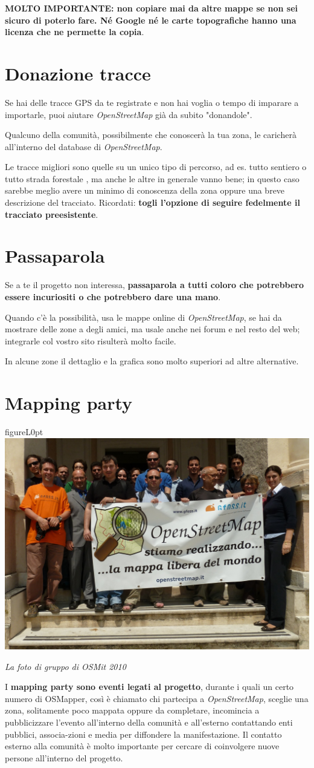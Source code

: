 \documentclass[a4paper,twoside,12pt,]{article}
\newcommand{\osm}{\emph{OpenStreetMap}\xspace}
\newcommand{\gps}{GPS\xspace}
\begin{document}
\textbf{MOLTO IMPORTANTE: non copiare mai da altre mappe se non sei sicuro di poterlo fare. Né Google né le carte topografiche hanno una licenza che ne permette la copia}.

\section{Donazione tracce}
Se hai delle tracce \gps da te registrate e non hai voglia o tempo di imparare a importarle, puoi aiutare \osm già da subito "donandole".

Qualcuno della comunità, possibilmente che conoscerà la tua zona, le caricherà all'interno del database di \osm.

Le tracce migliori sono quelle su un unico tipo di percorso, ad es. tutto sentiero o tutto strada forestale , ma anche le altre in generale vanno bene; in questo caso sarebbe meglio avere un minimo di conoscenza della zona oppure una breve descrizione del tracciato. Ricordati: \textbf{togli l'opzione di seguire fedelmente il tracciato preesistente}.
\section{Passaparola}
Se a te il progetto non interessa, \textbf{passaparola a tutti coloro che potrebbero essere incuriositi o che potrebbero dare una mano}.

Quando c'è la possibilità, usa le mappe online di \osm, se hai da mostrare delle zone a degli amici, ma usale anche nei forum e nel resto del web; integrarle col vostro sito risulterà molto facile. %
 
In alcune zone il dettaglio e la grafica sono molto superiori ad altre alternative.
\section{Mapping party}
\begin{wrapfloat}{figure}{L}{0pt}
 \includegraphics[width=0.55\columnwidth]{Osmit2010.JPG}
 \caption{\small{\textit{La foto di gruppo di OSMit 2010}}}
\end{wrapfloat}
I \textbf{mapping party sono eventi legati al progetto}, durante i quali un certo numero di OSMapper, così è chiamato chi partecipa a \osm, sceglie una zona, solitamente poco mappata oppure da completare, incomincia a pubblicizzare l'evento all'interno della comunità e all'esterno contattando enti pubblici, associa-zioni e media per diffondere la manifestazione. Il contatto esterno alla comunità è molto importante per cercare di coinvolgere nuove persone all'interno del progetto.
\end{document}

